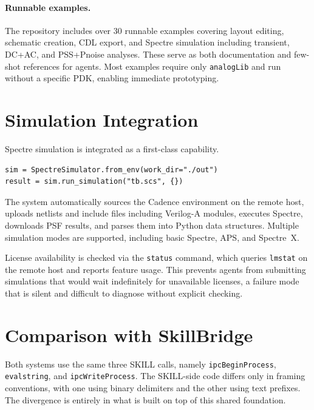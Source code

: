 \documentclass[lettersize,journal]{ieee_template/IEEEtran}
\begin{document}
\paragraph{Runnable examples.} The repository includes over 30 runnable examples covering layout editing, schematic creation, CDL export, and Spectre simulation including transient, DC+AC, and PSS+Pnoise analyses. These serve as both documentation and few-shot references for agents. Most examples require only \texttt{analogLib} and run without a specific PDK, enabling immediate prototyping.

\section{Simulation Integration}

Spectre simulation is integrated as a first-class capability.

\begin{verbatim}
sim = SpectreSimulator.from_env(work_dir="./out")
result = sim.run_simulation("tb.scs", {})
\end{verbatim}

The system automatically sources the Cadence environment on the remote host, uploads netlists and include files including Verilog-A modules, executes Spectre, downloads PSF results, and parses them into Python data structures. Multiple simulation modes are supported, including basic Spectre, APS, and Spectre~X.

License availability is checked via the \texttt{status} command, which queries \texttt{lmstat} on the remote host and reports feature usage. This prevents agents from submitting simulations that would wait indefinitely for unavailable licenses, a failure mode that is silent and difficult to diagnose without explicit checking.

\section{Comparison with SkillBridge}



Both systems use the same three SKILL calls, namely \texttt{ipcBeginProcess}, \texttt{evalstring}, and \texttt{ipcWriteProcess}. The SKILL-side code differs only in framing conventions, with one using binary delimiters and the other using text prefixes. The divergence is entirely in what is built on top of this shared foundation.
\end{document}
